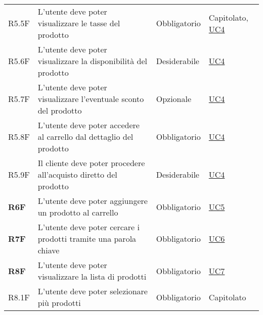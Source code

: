 \begin{center}
\begin{longtable}[!h]{p{50px} p{245px} p{75px} p{50px}}
        R5.5F                                 & L'utente deve poter visualizzare le tasse del prodotto                                                                                                 & Obbligatorio             & Capitolato, \newline \hyperref[sec:UC4]{UC4}   \\
        R5.6F                                 & L'utente deve poter visualizzare la disponibilità del prodotto                                                                                         & Desiderabile             & \hyperref[sec:UC4]{UC4}                        \\
        R5.7F                                 & L'utente deve poter visualizzare l'eventuale sconto del prodotto                                                                                       & Opzionale                & \hyperref[sec:UC4]{UC4}                        \\
        R5.8F                                 & L'utente deve poter accedere al carrello dal dettaglio del prodotto                                                                                    & Obbligatorio             & \hyperref[sec:UC4]{UC4}                        \\
        R5.9F                                 & Il cliente deve poter procedere all'acquisto diretto del prodotto                                                                                      & Desiderabile             & \hyperref[sec:UC4]{UC4}                        \\
        \textbf{R6F}                          & L'utente deve poter aggiungere un prodotto al carrello                                                                                                 & Obbligatorio             & \hyperref[sec:UC5]{UC5}                        \\
        \textbf{R7F}                          & L'utente deve poter cercare i prodotti tramite una parola chiave                                                                                       & Obbligatorio             & \hyperref[sec:UC6]{UC6}                        \\
        \textbf{R8F}                          & L'utente deve poter visualizzare la lista di prodotti                                                                                                  & Obbligatorio             & \hyperref[sec:UC7]{UC7}                        \\
        R8.1F                                 & L'utente deve poter selezionare più prodotti                                                                                                           & Obbligatorio             & Capitolato                                     \\

\end{longtable}
\end{center}
